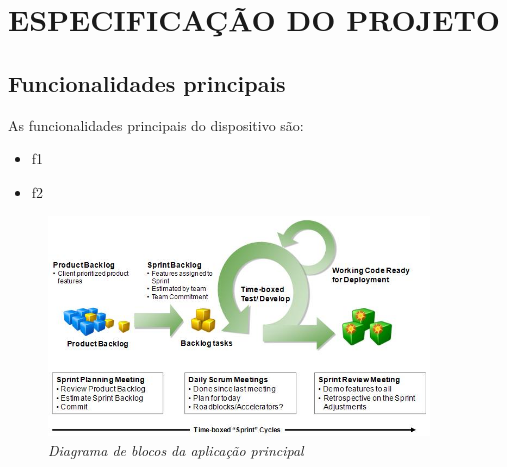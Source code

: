 \chapter{ESPECIFICAÇÃO DO PROJETO}

\section{Funcionalidades principais}

As funcionalidades principais do dispositivo são:

\begin{itemize}

	\item f1

	\item f2

\end{itemize}

\begin{figure}[htb]
  \centering
  \includegraphics[width=0.9\textwidth]{imagens/scrum}
  \caption{\it Diagrama de blocos da aplicação principal}
  \label{fig:blocos_aplicacao}
\end{figure}